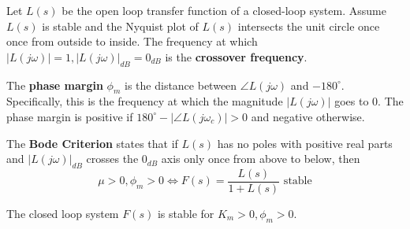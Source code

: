 \documentclass[11pt]{article}
\begin{document}
Let \(L(s)\) be the open loop transfer function of a closed-loop system.
Assume \(L(s)\) is stable and the Nyquist plot of \(L(s)\) intersects the unit circle once once
from outside to inside.
The frequency at which \(|L(j \omega)| = 1, |L(j \omega)|_{dB} = 0_{dB}\) is
the \textbf{crossover frequency}.

The \textbf{phase margin} \(\phi_{m}\) is the distance between \(\angle L(j \omega)\) and \(-180^{\circ}\).
Specifically, this is the frequency at which the magnitude \(|L(j\omega)|\) goes to 0.
The phase margin is positive if \(180^{\circ} - | \angle L(j \omega_{c}) | > 0\) and
negative otherwise.

The \textbf{Bode Criterion} states that if \(L(s)\) has no poles with positive real parts and
\(|L(j \omega)|_{dB}\) crosses the \(0_{dB}\) axis only once from above to below, then
$$ \mu > 0, \phi_{m} > 0 \iff F(s) = \frac{L(s)}{1 + L(s)} \text{ stable} $$

The closed loop system \(F(s)\) is stable for \(K_{m} > 0, \phi_{m} > 0\).
\end{document}
